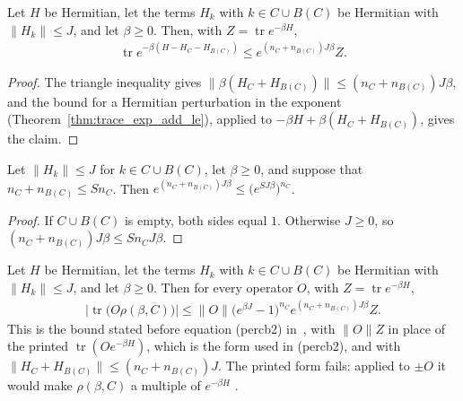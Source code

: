 \begin{lemma}
    \label{thm:hastings_cluster_removal_trace}
    \leanok
    Let $H$ be Hermitian, let the terms $H_k$ with $k\in C\cup B(C)$ be Hermitian
    with $\|H_k\|\le J$, and let $\beta\ge0$. Then, with
    $Z=\operatorname{tr}e^{-\beta H}$,
    \begin{align}
        \operatorname{tr}e^{-\beta(H-H_C-H_{B(C)})}\le e^{(n_C+n_{B(C)})J\beta}Z.
        \label{eq:hastings_cluster_removal_trace}
    \end{align}
\end{lemma}

\begin{proof}
    \leanok
    The triangle inequality gives
    $\|\beta(H_C+H_{B(C)})\|\le(n_C+n_{B(C)})J\beta$, and the bound for a
    Hermitian perturbation in the exponent (Theorem~\ref{thm:trace_exp_add_le}),
    applied to $-\beta H+\beta(H_C+H_{B(C)})$, gives the claim.
\end{proof}

\begin{lemma}
    \label{thm:hastings_cluster_exp_count}
    \leanok
    Let $\|H_k\|\le J$ for $k\in C\cup B(C)$, let $\beta\ge0$, and suppose that
    $n_C+n_{B(C)}\le Sn_C$. Then
    $e^{(n_C+n_{B(C)})J\beta}\le\bigl(e^{SJ\beta}\bigr)^{n_C}$.
\end{lemma}

\begin{proof}
    \leanok
    If $C\cup B(C)$ is empty, both sides equal $1$. Otherwise $J\ge0$, so
    $(n_C+n_{B(C)})J\beta\le Sn_CJ\beta$.
\end{proof}

\begin{lemma}
    \label{thm:hastings_cluster_part_bound}
    \leanok
    Let $H$ be Hermitian, let the terms $H_k$ with $k\in C\cup B(C)$ be Hermitian
    with $\|H_k\|\le J$, and let $\beta\ge0$. Then for every operator $O$,
    with $Z=\operatorname{tr}e^{-\beta H}$,
    \begin{align}
        \left|\operatorname{tr}\bigl(O\rho(\beta,C)\bigr)\right|
        \le\|O\|\bigl(e^{\beta J}-1\bigr)^{n_C}e^{(n_C+n_{B(C)})J\beta}Z.
        \label{eq:hastings_cluster_part_bound}
    \end{align}
    This is the bound stated before equation (percb2)
    in~\cite[lines 1174--1195]{Hastings2006Solving}, with $\|O\|Z$ in place of the
    printed $\operatorname{tr}(Oe^{-\beta H})$, which is the form used in (percb2),
    and with $\|H_C+H_{B(C)}\|\le(n_C+n_{B(C)})J$. The printed form fails: applied
    to $\pm O$ it would make $\rho(\beta,C)$ a multiple of $e^{-\beta H}$
    \cite{gap:hastings05_cluster_part_trace_pairing}.
\end{lemma}

